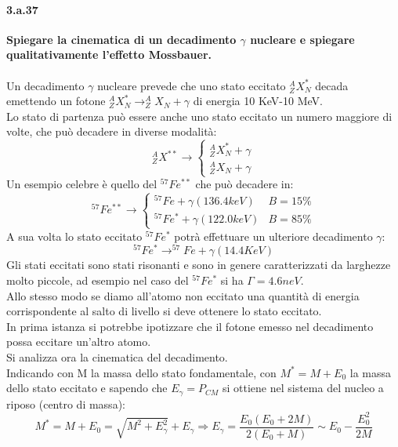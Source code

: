 \documentclass[twoside]{article}
\begin{document}
\paragraph{3.a.37}\textbf{Spiegare la cinematica di un decadimento $\gamma$ nucleare e spiegare qualitativamente
l'effetto Mossbauer.}\\\\
Un decadimento $\gamma$ nucleare prevede che uno stato eccitato  $^A_ZX_N^*$ decada emettendo un fotone $^A_ZX_N^*\to^A_ZX_N+\gamma$ di energia 10 KeV-10 MeV.\\
Lo stato di partenza può essere anche uno stato eccitato un numero maggiore di volte, che può decadere in diverse modalità:
\begin{equation}
    ^A_ZX^{**}\to\begin{cases}
    ^A_ZX_N^*+\gamma\\ ^A_ZX_N+\gamma
\end{cases}
\end{equation}
Un esempio celebre è quello del $^{57}Fe^{**}$ che può decadere in:
\begin{equation}
    ^{57}Fe^{**}\to\begin{cases}
    ^{57}Fe+\gamma(136.4 keV) & B=15\%\\ ^{57}Fe^*+\gamma(122.0 keV) &B=85\%
\end{cases}
\end{equation}
A sua volta lo stato eccitato $^{57}Fe^*$ potrà effettuare un ulteriore decadimento $\gamma$:
\begin{equation}
    ^{57}Fe^*\to ^{57}Fe+\gamma(14.4 KeV)
\end{equation}
Gli stati eccitati sono stati risonanti e sono in genere caratterizzati da larghezze molto piccole, ad esempio nel caso del $^{57}Fe^*$ si ha $\Gamma=4.6 neV$.\\
Allo stesso modo se diamo all'atomo non eccitato una quantità di energia corrispondente al salto di livello si deve ottenere lo stato eccitato.\\
In prima istanza si potrebbe ipotizzare che il fotone emesso nel decadimento possa eccitare un'altro atomo.\\
Si analizza ora la cinematica del decadimento.\\
Indicando con M la massa dello stato fondamentale, con $M^*=M+E_0$ la massa dello stato eccitato e sapendo che $E_\gamma=P_{CM}$ si ottiene nel sistema del nucleo a riposo (centro di massa):
\begin{equation}
    M^*=M+E_0=\sqrt{M^2+E^2_\gamma}+E_\gamma \Longrightarrow E_\gamma=\frac{E_0(E_0+2M)}{2(E_0+M)}\sim E_0-\frac{E_0^2}{2M}
\end{equation}
\end{document}
